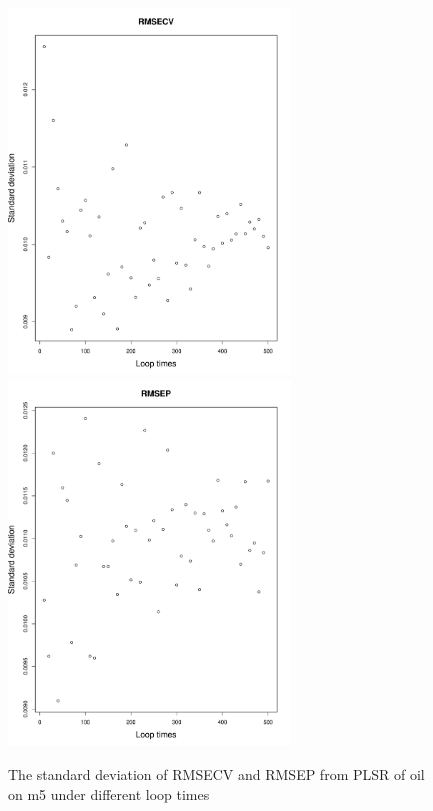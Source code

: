\documentclass[a4paper,12pt,titlepage]{article} %
\numberwithin{equation}{section}  %
\begin{document}
\begin{figure}[h]    %
	\centering           %
	\includegraphics[width=7.5cm, angle=0]{sd_RMSECV_loop_times_500.pdf}  %
	\includegraphics[width=7.5cm, angle=0]{sd_RMSEP_loop_times_500.pdf} %
	\vspace*{-0.25cm}    %
	\caption{The standard deviation of RMSECV and RMSEP from PLSR of oil on m5 under different loop times}          %
	\label{fig:sd_RMSECV_RMSEP}               %
\end{figure}                        %
	
\end{document}
